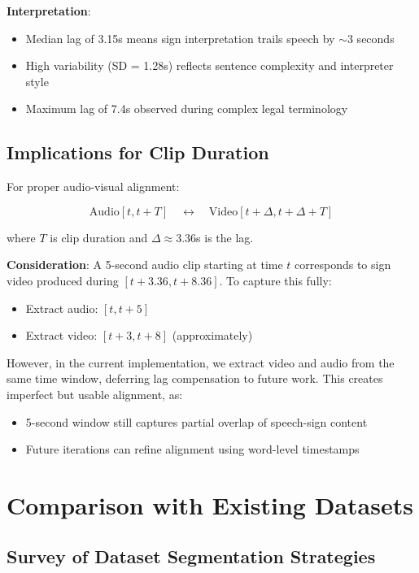 \documentclass[11pt,a4paper]{article}
\begin{document}
\textbf{Interpretation}:
\begin{itemize}
    \item Median lag of 3.15s means sign interpretation trails speech by $\sim$3 seconds
    \item High variability (SD = 1.28s) reflects sentence complexity and interpreter style
    \item Maximum lag of 7.4s observed during complex legal terminology
\end{itemize}

\subsection{Implications for Clip Duration}

For proper audio-visual alignment:

\begin{equation}
\text{Audio}[t, t + T] \quad \leftrightarrow \quad \text{Video}[t + \Delta, t + \Delta + T]
\end{equation}

where $T$ is clip duration and $\Delta \approx 3.36$s is the lag.

\textbf{Consideration}: A 5-second audio clip starting at time $t$ corresponds to sign video produced during $[t + 3.36, t + 8.36]$. To capture this fully:

\begin{itemize}
    \item Extract audio: $[t, t+5]$
    \item Extract video: $[t+3, t+8]$ (approximately)
\end{itemize}

However, in the current implementation, we extract video and audio from the same time window, deferring lag compensation to future work. This creates imperfect but usable alignment, as:
\begin{itemize}
    \item 5-second window still captures partial overlap of speech-sign content
    \item Future iterations can refine alignment using word-level timestamps
\end{itemize}

\section{Comparison with Existing Datasets}

\subsection{Survey of Dataset Segmentation Strategies}
\end{document}
